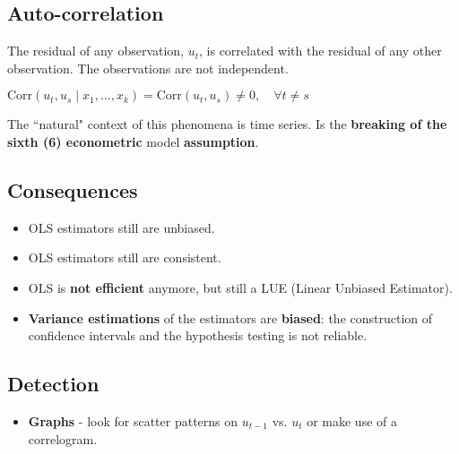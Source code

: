 \documentclass[10pt, a4paper, landscape]{article}
\newcommand{\Corr}{\mathrm{Corr}}
\begin{document}
\begin{multicols}{3}
		\columnbreak
		
		\section*{Auto-correlation}
		
		The residual of any observation, $u_{t}$, is correlated with the residual of any other observation. The observations are not independent.
		
		\begin{center}
			$\Corr(u_{t}, u_{s} \mid x_{1}, \ldots, x_{k}) = \Corr(u_{t}, u_{s}) \neq 0, \quad \forall t \neq s$
		\end{center}
		
		The ``natural" context of this phenomena is time series. Is the \textbf{breaking of the sixth (6) econometric} model \textbf{assumption}.
		
		\subsection*{Consequences}
		
		\begin{itemize}[leftmargin=*]
			\item OLS estimators still are unbiased.
			\item OLS estimators still are consistent.
			\item OLS is \textbf{not efficient} anymore, but still a LUE (Linear Unbiased Estimator).
			\item \textbf{Variance estimations} of the estimators are \textbf{biased}: the construction of confidence intervals and the hypothesis testing is not reliable.
		\end{itemize}
		
		\subsection*{Detection}
		
		\begin{itemize}[leftmargin=*]
			\item \textbf{Graphs} - look for scatter patterns on $u_{t - 1}$ vs. $u_{t}$ or make use of a correlogram.
			
			\setlength{\multicolsep}{0pt}
			\setlength{\columnsep}{6pt}
			\begin{multicols}{3}
				\begin{center}
				\end{center}
				

\end{multicols}
\end{itemize}
\end{multicols}
\end{document}
